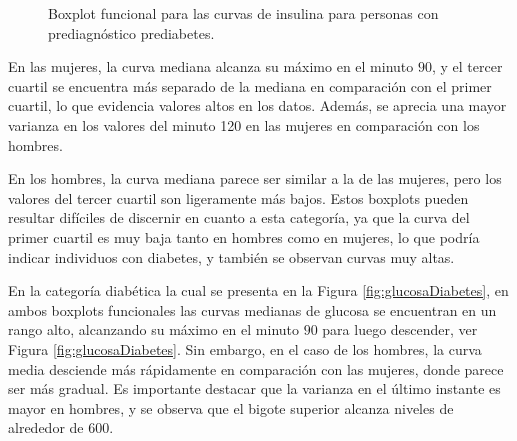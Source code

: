 \begin{figure}[H]
 \centering
    \caption{Boxplot funcional para las curvas de insulina para personas con prediagnóstico prediabetes.}
    \label{fig:insulinaPredia}
\end{figure}

En las mujeres, la curva mediana alcanza su máximo en el minuto $90$, y el tercer cuartil se encuentra más separado de la mediana en comparación con el primer cuartil, lo que evidencia valores altos en los datos. Además, se aprecia una mayor varianza en los valores del minuto 120 en las mujeres en comparación con los hombres.


En los hombres, la curva mediana parece ser similar a la de las mujeres, pero los valores del tercer cuartil son ligeramente más bajos. Estos boxplots pueden resultar difíciles de discernir en cuanto a esta categoría, ya que la curva del primer cuartil es muy baja tanto en hombres como en mujeres, lo que podría indicar individuos con diabetes, y también se observan curvas muy altas.



En la categoría diabética la cual se presenta en la Figura \ref{fig:glucosaDiabetes}, en ambos boxplots funcionales las curvas medianas de glucosa se encuentran en un rango alto, alcanzando su máximo en el minuto $90$ para luego descender, ver Figura \ref{fig:glucosaDiabetes}. Sin embargo, en el caso de los hombres, la curva media desciende más rápidamente en comparación con las mujeres, donde parece ser más gradual. Es importante destacar que la varianza en el último instante es mayor en hombres, y se observa que el bigote superior alcanza niveles de alrededor de $600$.

